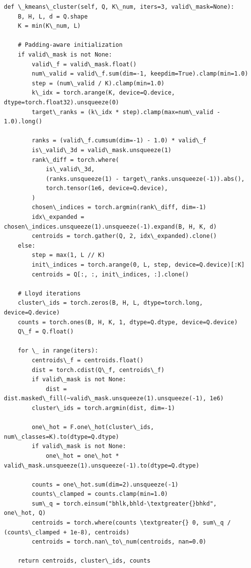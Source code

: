 \begin{lstlisting}
def \_kmeans\_cluster(self, Q, K\_num, iters=3, valid\_mask=None):
    B, H, L, d = Q.shape
    K = min(K\_num, L)
    
    # Padding-aware initialization
    if valid\_mask is not None:
        valid\_f = valid\_mask.float()
        num\_valid = valid\_f.sum(dim=-1, keepdim=True).clamp(min=1.0)
        step = (num\_valid / K).clamp(min=1.0)
        k\_idx = torch.arange(K, device=Q.device, dtype=torch.float32).unsqueeze(0)
        target\_ranks = (k\_idx * step).clamp(max=num\_valid - 1.0).long()
        
        ranks = (valid\_f.cumsum(dim=-1) - 1.0) * valid\_f
        is\_valid\_3d = valid\_mask.unsqueeze(1)
        rank\_diff = torch.where(
            is\_valid\_3d,
            (ranks.unsqueeze(1) - target\_ranks.unsqueeze(-1)).abs(),
            torch.tensor(1e6, device=Q.device),
        )
        chosen\_indices = torch.argmin(rank\_diff, dim=-1)
        idx\_expanded = chosen\_indices.unsqueeze(1).unsqueeze(-1).expand(B, H, K, d)
        centroids = torch.gather(Q, 2, idx\_expanded).clone()
    else:
        step = max(1, L // K)
        init\_indices = torch.arange(0, L, step, device=Q.device)[:K]
        centroids = Q[:, :, init\_indices, :].clone()
    
    # Lloyd iterations
    cluster\_ids = torch.zeros(B, H, L, dtype=torch.long, device=Q.device)
    counts = torch.ones(B, H, K, 1, dtype=Q.dtype, device=Q.device)
    Q\_f = Q.float()
    
    for \_ in range(iters):
        centroids\_f = centroids.float()
        dist = torch.cdist(Q\_f, centroids\_f)
        if valid\_mask is not None:
            dist = dist.masked\_fill(~valid\_mask.unsqueeze(1).unsqueeze(-1), 1e6)
        cluster\_ids = torch.argmin(dist, dim=-1)
        
        one\_hot = F.one\_hot(cluster\_ids, num\_classes=K).to(dtype=Q.dtype)
        if valid\_mask is not None:
            one\_hot = one\_hot * valid\_mask.unsqueeze(1).unsqueeze(-1).to(dtype=Q.dtype)
        
        counts = one\_hot.sum(dim=2).unsqueeze(-1)
        counts\_clamped = counts.clamp(min=1.0)
        sum\_q = torch.einsum("bhlk,bhld-\textgreater{}bhkd", one\_hot, Q)
        centroids = torch.where(counts \textgreater{} 0, sum\_q / (counts\_clamped + 1e-8), centroids)
        centroids = torch.nan\_to\_num(centroids, nan=0.0)
    
    return centroids, cluster\_ids, counts
\end{lstlisting}

